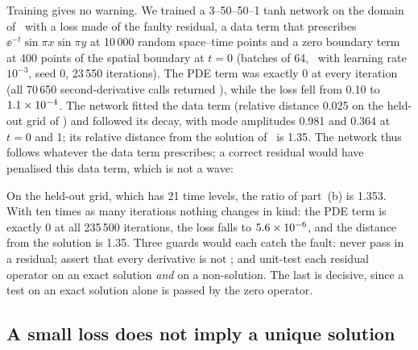 Training gives no warning. We trained a 3--50--50--1 tanh network on the domain of \PWtwo\ with
a loss made of the faulty residual, a data term that prescribes $\ee^{-t}\sin\pi x\sin\pi y$ at
10\,000 random space--time points and a zero boundary term at 400 points of the spatial boundary at
$t=0$ (batches of 64, \Adam\
with learning rate $10^{-3}$, seed 0, 23\,550 iterations). The PDE term was exactly 0 at every
iteration (all 70\,650 second-derivative calls returned \code{None}), while the loss fell from
0.10 to $1.1\times 10^{-4}$. The network fitted the data term (relative distance 0.025 on the held-out
grid of \PWtwo) and followed its decay, with mode amplitudes 0.981 and 0.364 at $t=0$ and 1; its
relative distance from the solution of \PWtwo\ is 1.35. The network thus follows whatever the data
term prescribes; a correct residual would have penalised this data term, which is not a wave:

\begin{proposition}\label{s7_pitfalls:prop:notwave}
\StmtNotWave
\end{proposition}

\noindent On the held-out grid, which has 21 time levels, the ratio of part~(b) is 1.353. With ten
times as many iterations nothing changes in kind: the PDE term is exactly 0 at all 235\,500
iterations, the loss falls to $5.6\times 10^{-6}$, and the distance from the solution is 1.35. Three
guards would each catch the fault: never pass \code{allow_unused=True} in a residual; assert that
every derivative is not \code{None}; and unit-test each residual operator on an exact solution
\emph{and} on a non-solution. The last is decisive, since a test on an exact solution alone is
passed by the zero operator.

\subsection{A small loss does not imply a unique solution}\label{s7_pitfalls:sec:oneface}

